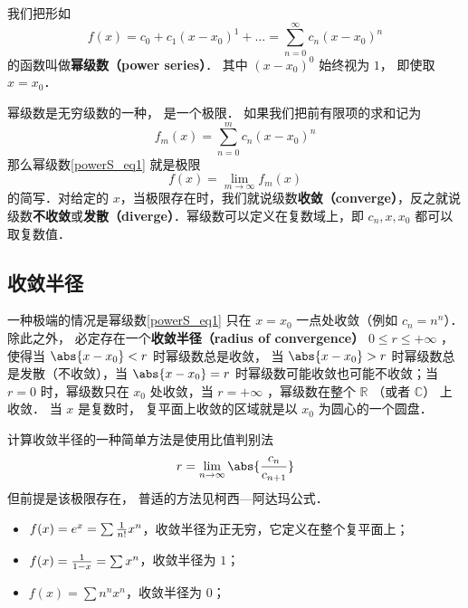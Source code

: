 
\begin{issues}
\issueDraft
\end{issues}


我们把形如
\begin{equation}\label{powerS_eq1}
f(x) = c_0 + c_1 (x - x_0)^1 + \dots = \sum_{n=0}^\infty c_n (x-x_0)^n
\end{equation}
的函数叫做\textbf{幂级数（power series）}． 其中 $(x - x_0)^0$ 始终视为 $1$， 即使取 $x = x_0$．

幂级数是无穷级数的一种， 是一个极限． 如果我们把前有限项的求和记为
\begin{equation}
f_m(x) = \sum_{n=0}^m c_n (x-x_0)^n
\end{equation}
那么幂级数\autoref{powerS_eq1} 就是极限
\begin{equation}
f(x) = \lim_{m\to\infty} f_m(x)
\end{equation}
的简写．对给定的 $x$，当极限存在时，我们就说级数\textbf{收敛（converge）}，反之就说级数\textbf{不收敛}或\textbf{发散（diverge）}．幂级数可以定义在复数域上，即 $c_n, x, x_0$ 都可以取复数值．

\subsection{收敛半径}
一种极端的情况是幂级数\autoref{powerS_eq1} 只在 $x = x_0$ 一点处收敛（例如 $c_n = n^n$）． 除此之外， 必定存在一个\textbf{收敛半径（radius of convergence）} $0 \leq r \leq +\infty$ ， 使得当 $\abs{x-x_0} < r$ 时幂级数总是收敛， 当 $\abs{x-x_0} > r$ 时幂级数总是发散（不收敛），当 $\abs{x - x_0} = r$ 时幂级数可能收敛也可能不收敛；当 $r = 0$ 时，幂级数只在 $x_0$ 处收敛，当 $r = + \infty$ ，幂级数在整个 $\mathbb{R}$ （或者 $\mathbb{C}$） 上收敛． 当 $x$ 是复数时， 复平面上收敛的区域就是以 $x_0$ 为圆心的一个圆盘．

计算收敛半径的一种简单方法是使用比值判别法
\begin{equation}
r = \lim_{n \to \infty} \abs{\frac{c_n}{c_{n+1}}}
\end{equation}
但前提是该极限存在， 普适的方法见柯西—阿达玛公式．

\begin{example}{}
\begin{itemize}
\item $f(x) = e^x = \sum {1 \over n!} x^n$，收敛半径为正无穷，它定义在整个复平面上；
\item $f(x) = {1 \over 1 - x} = \sum x^n$，收敛半径为 $1$；
\item $f(x) = \sum n^n x^n$，收敛半径为 $0$；
\end{itemize}
\end{example}
